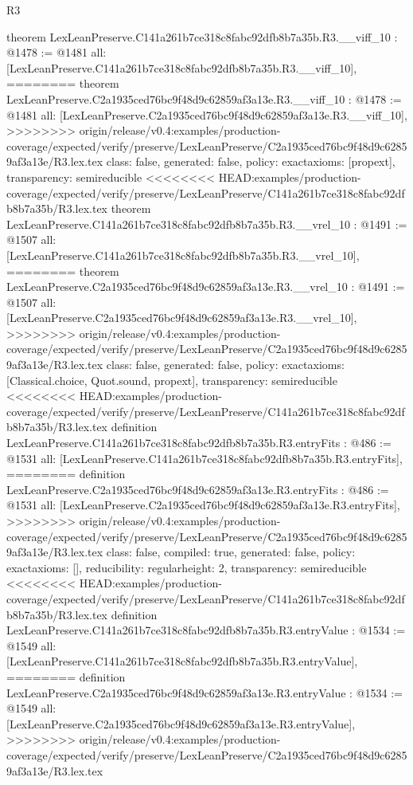 \begin{lexlean}{R3}
\begin{coremodule}
{{{{{{{theorem LexLeanPreserve.C141a261b7ce318c8fabc92dfb8b7a35b.R3.__viff_10 : @1478 := @1481 {
  all: [LexLeanPreserve.C141a261b7ce318c8fabc92dfb8b7a35b.R3.__viff_10],
========
theorem LexLeanPreserve.C2a1935ced76bc9f48d9c62859af3a13e.R3.__viff_10 : @1478 := @1481 {
  all: [LexLeanPreserve.C2a1935ced76bc9f48d9c62859af3a13e.R3.__viff_10],
>>>>>>>> origin/release/v0.4:examples/production-coverage/expected/verify/preserve/LexLeanPreserve/C2a1935ced76bc9f48d9c62859af3a13e/R3.lex.tex
  class: false,
  generated: false,
  policy: exact{axioms: [propext]},
  transparency: semireducible
}
<<<<<<<< HEAD:examples/production-coverage/expected/verify/preserve/LexLeanPreserve/C141a261b7ce318c8fabc92dfb8b7a35b/R3.lex.tex
theorem LexLeanPreserve.C141a261b7ce318c8fabc92dfb8b7a35b.R3.__vrel_10 : @1491 := @1507 {
  all: [LexLeanPreserve.C141a261b7ce318c8fabc92dfb8b7a35b.R3.__vrel_10],
========
theorem LexLeanPreserve.C2a1935ced76bc9f48d9c62859af3a13e.R3.__vrel_10 : @1491 := @1507 {
  all: [LexLeanPreserve.C2a1935ced76bc9f48d9c62859af3a13e.R3.__vrel_10],
>>>>>>>> origin/release/v0.4:examples/production-coverage/expected/verify/preserve/LexLeanPreserve/C2a1935ced76bc9f48d9c62859af3a13e/R3.lex.tex
  class: false,
  generated: false,
  policy: exact{axioms: [Classical.choice, Quot.sound, propext]},
  transparency: semireducible
}
<<<<<<<< HEAD:examples/production-coverage/expected/verify/preserve/LexLeanPreserve/C141a261b7ce318c8fabc92dfb8b7a35b/R3.lex.tex
definition LexLeanPreserve.C141a261b7ce318c8fabc92dfb8b7a35b.R3.entryFits : @486 := @1531 {
  all: [LexLeanPreserve.C141a261b7ce318c8fabc92dfb8b7a35b.R3.entryFits],
========
definition LexLeanPreserve.C2a1935ced76bc9f48d9c62859af3a13e.R3.entryFits : @486 := @1531 {
  all: [LexLeanPreserve.C2a1935ced76bc9f48d9c62859af3a13e.R3.entryFits],
>>>>>>>> origin/release/v0.4:examples/production-coverage/expected/verify/preserve/LexLeanPreserve/C2a1935ced76bc9f48d9c62859af3a13e/R3.lex.tex
  class: false,
  compiled: true,
  generated: false,
  policy: exact{axioms: []},
  reducibility: regular{height: 2},
  transparency: semireducible
}
<<<<<<<< HEAD:examples/production-coverage/expected/verify/preserve/LexLeanPreserve/C141a261b7ce318c8fabc92dfb8b7a35b/R3.lex.tex
definition LexLeanPreserve.C141a261b7ce318c8fabc92dfb8b7a35b.R3.entryValue : @1534 := @1549 {
  all: [LexLeanPreserve.C141a261b7ce318c8fabc92dfb8b7a35b.R3.entryValue],
========
definition LexLeanPreserve.C2a1935ced76bc9f48d9c62859af3a13e.R3.entryValue : @1534 := @1549 {
  all: [LexLeanPreserve.C2a1935ced76bc9f48d9c62859af3a13e.R3.entryValue],
>>>>>>>> origin/release/v0.4:examples/production-coverage/expected/verify/preserve/LexLeanPreserve/C2a1935ced76bc9f48d9c62859af3a13e/R3.lex.tex
}}}}}}}}}}}}
\end{coremodule}
\end{lexlean}
